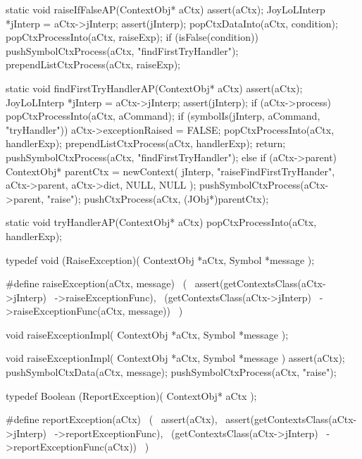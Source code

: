 \startCCode
static void raiseIfFalseAP(ContextObj* aCtx) {
  assert(aCtx);
  JoyLoLInterp *jInterp = aCtx->jInterp;
  assert(jInterp);
  popCtxDataInto(aCtx, condition);
  popCtxProcessInto(aCtx, raiseExp);
  if (isFalse(condition)) {
    pushSymbolCtxProcess(aCtx, "findFirstTryHandler");
    prependListCtxProcess(aCtx, raiseExp);
  }
}
\stopCCode

\startCCode
static void findFirstTryHandlerAP(ContextObj* aCtx) {
  assert(aCtx);
  JoyLoLInterp *jInterp = aCtx->jInterp;
  assert(jInterp);
  if (aCtx->process) {
    popCtxProcessInto(aCtx, aCommand);
    if (symbolIs(jInterp, aCommand, "tryHandler")) {
      aCtx->exceptionRaised = FALSE;
      popCtxProcessInto(aCtx, handlerExp);
      prependListCtxProcess(aCtx, handlerExp);
      return;
    }
    pushSymbolCtxProcess(aCtx, "findFirstTryHandler");
  } else {
    if (aCtx->parent) {
      ContextObj* parentCtx = newContext(
        jInterp,
        "raiseFindFirstTryHander",
        aCtx->parent,
        aCtx->dict,
        NULL,
        NULL
      );
      pushSymbolCtxProcess(aCtx->parent, "raise");
      pushCtxProcess(aCtx, (JObj*)parentCtx);
    }
  }
}
\stopCCode

\startCCode
static void tryHandlerAP(ContextObj* aCtx) {
  popCtxProcessInto(aCtx, handlerExp);
}
\stopCCode

\startCHeader
typedef void (RaiseException)(
  ContextObj *aCtx,
  Symbol     *message
);

#define raiseException(aCtx, message)       \
  (                                         \
    assert(getContextsClass(aCtx->jInterp)  \
      ->raiseExceptionFunc),                \
    (getContextsClass(aCtx->jInterp)        \
      ->raiseExceptionFunc(aCtx, message))  \
  )
\stopCHeader

\setCHeaderStream{private}
\startCHeader
void raiseExceptionImpl(
  ContextObj *aCtx,
  Symbol     *message
);
\stopCHeader
{}

\startCCode
void raiseExceptionImpl(
  ContextObj *aCtx,
  Symbol     *message
) {
  assert(aCtx);
  pushSymbolCtxData(aCtx, message);
  pushSymbolCtxProcess(aCtx, "raise");
}
\stopCCode

\startCHeader
typedef Boolean (ReportException)(
  ContextObj* aCtx
);

#define reportException(aCtx)               \
  (                                         \
    assert(aCtx),                           \
    assert(getContextsClass(aCtx->jInterp)  \
      ->reportExceptionFunc),               \
    (getContextsClass(aCtx->jInterp)        \
      ->reportExceptionFunc(aCtx))          \
  )
\stopCHeader

